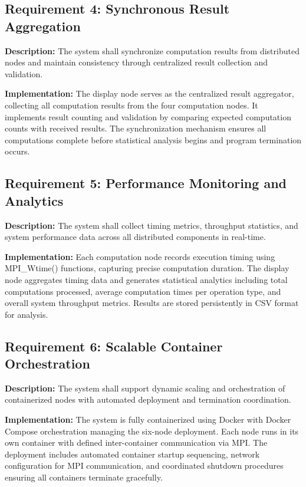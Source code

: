 \documentclass{article}
\begin{document}
\subsection{Requirement 4: Synchronous Result Aggregation}
\textbf{Description:} 
The system shall synchronize computation results from distributed nodes and maintain consistency through centralized result collection and validation.

\textbf{Implementation:} 
The display node serves as the centralized result aggregator, collecting all computation results from the four computation nodes. It implements result counting and validation by comparing expected computation counts with received results. The synchronization mechanism ensures all computations complete before statistical analysis begins and program termination occurs.

\subsection{Requirement 5: Performance Monitoring and Analytics}
\textbf{Description:} 
The system shall collect timing metrics, throughput statistics, and system performance data across all distributed components in real-time.

\textbf{Implementation:} 
Each computation node records execution timing using MPI\_Wtime() functions, capturing precise computation duration. The display node aggregates timing data and generates statistical analytics including total computations processed, average computation times per operation type, and overall system throughput metrics. Results are stored persistently in CSV format for analysis.

\subsection{Requirement 6: Scalable Container Orchestration}
\textbf{Description:} 
The system shall support dynamic scaling and orchestration of containerized nodes with automated deployment and termination coordination.

\textbf{Implementation:} 
The system is fully containerized using Docker with Docker Compose orchestration managing the six-node deployment. Each node runs in its own container with defined inter-container communication via MPI. The deployment includes automated container startup sequencing, network configuration for MPI communication, and coordinated shutdown procedures ensuring all containers terminate gracefully.
\end{document}
